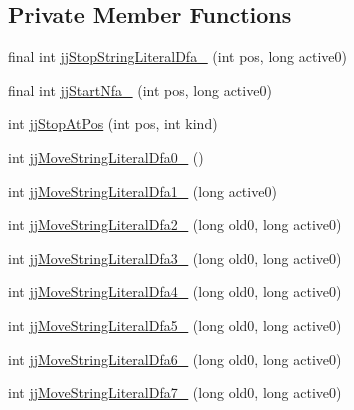 \subsection*{Private Member Functions}
\begin{DoxyCompactItemize}
\item 
final int \hyperlink{classorg_1_1coode_1_1owl_1_1krssparser_1_1_k_r_s_s_parser_token_manager_a3672596b43649280638dd3a1a287af54}{jj\-Stop\-String\-Literal\-Dfa\-\_} (int pos, long active0)
\item 
final int \hyperlink{classorg_1_1coode_1_1owl_1_1krssparser_1_1_k_r_s_s_parser_token_manager_ac24bc988ed99e3514f257adddd5efc00}{jj\-Start\-Nfa\-\_} (int pos, long active0)
\item 
int \hyperlink{classorg_1_1coode_1_1owl_1_1krssparser_1_1_k_r_s_s_parser_token_manager_ac2a1cbf2c0595355cadbdecbc9e9bb13}{jj\-Stop\-At\-Pos} (int pos, int kind)
\item 
int \hyperlink{classorg_1_1coode_1_1owl_1_1krssparser_1_1_k_r_s_s_parser_token_manager_ab2feaa63724c8d7dc9dc720f1b16c1e5}{jj\-Move\-String\-Literal\-Dfa0\-\_} ()
\item 
int \hyperlink{classorg_1_1coode_1_1owl_1_1krssparser_1_1_k_r_s_s_parser_token_manager_a46ddf4b97a3edbede3877f35ff5a86b4}{jj\-Move\-String\-Literal\-Dfa1\-\_} (long active0)
\item 
int \hyperlink{classorg_1_1coode_1_1owl_1_1krssparser_1_1_k_r_s_s_parser_token_manager_adced61ec4a4608e0eedbe330e2b932e7}{jj\-Move\-String\-Literal\-Dfa2\-\_} (long old0, long active0)
\item 
int \hyperlink{classorg_1_1coode_1_1owl_1_1krssparser_1_1_k_r_s_s_parser_token_manager_ab1de3c31e6d0a47df232b8fb69315544}{jj\-Move\-String\-Literal\-Dfa3\-\_} (long old0, long active0)
\item 
int \hyperlink{classorg_1_1coode_1_1owl_1_1krssparser_1_1_k_r_s_s_parser_token_manager_ac09d61b0cb55dd9e2b516a6bd0dbe597}{jj\-Move\-String\-Literal\-Dfa4\-\_} (long old0, long active0)
\item 
int \hyperlink{classorg_1_1coode_1_1owl_1_1krssparser_1_1_k_r_s_s_parser_token_manager_ada7f7d5f22954bee76d4f78cbdd07875}{jj\-Move\-String\-Literal\-Dfa5\-\_} (long old0, long active0)
\item 
int \hyperlink{classorg_1_1coode_1_1owl_1_1krssparser_1_1_k_r_s_s_parser_token_manager_aee6487b9bf4ee29aa15c234a1424fc58}{jj\-Move\-String\-Literal\-Dfa6\-\_} (long old0, long active0)
\item 
int \hyperlink{classorg_1_1coode_1_1owl_1_1krssparser_1_1_k_r_s_s_parser_token_manager_a47e91a45a27cc30236f60e7904303445}{jj\-Move\-String\-Literal\-Dfa7\-\_} (long old0, long active0)

\end{DoxyCompactItemize}

